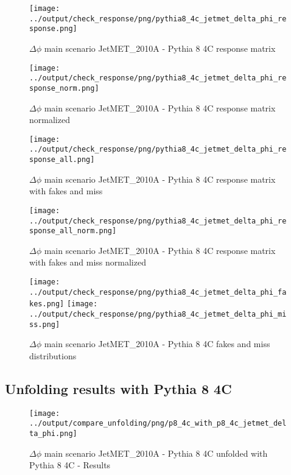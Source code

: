 \documentclass[11pt]{book}
\begin{document}
\begin{figure}[ht]
\centering
\texttt{[image: ../output/check\_response/png/pythia8\_4c\_jetmet\_delta\_phi\_response.png]}
\caption{$\Delta\phi$ main scenario JetMET\_2010A - Pythia 8 4C response matrix}
\label{p8_jetmet_delta_phi_response}
\end{figure}

\begin{figure}[ht]
\centering
\texttt{[image: ../output/check\_response/png/pythia8\_4c\_jetmet\_delta\_phi\_response\_norm.png]}
\caption{$\Delta\phi$ main scenario JetMET\_2010A - Pythia 8 4C response matrix normalized}
\label{p8_jetmet_delta_phi_response_norm}
\end{figure}

\begin{figure}[ht]
\centering
\texttt{[image: ../output/check\_response/png/pythia8\_4c\_jetmet\_delta\_phi\_response\_all.png]}
\caption{$\Delta\phi$ main scenario JetMET\_2010A - Pythia 8 4C response matrix with fakes and miss}
\label{p8_jetmet_delta_phi_response_all}
\end{figure}

\begin{figure}[ht]
\centering
\texttt{[image: ../output/check\_response/png/pythia8\_4c\_jetmet\_delta\_phi\_response\_all\_norm.png]}
\caption{$\Delta\phi$ main scenario JetMET\_2010A - Pythia 8 4C response matrix with fakes and miss normalized}
\label{p8_jetmet_delta_phi_response_all_norm}
\end{figure}

\begin{figure}[ht]
\centering
\texttt{[image: ../output/check\_response/png/pythia8\_4c\_jetmet\_delta\_phi\_fakes.png]}
\texttt{[image: ../output/check\_response/png/pythia8\_4c\_jetmet\_delta\_phi\_miss.png]}
\caption{$\Delta\phi$ main scenario JetMET\_2010A - Pythia 8 4C fakes and miss distributions}
\label{p8_jetmet_delta_phi_fakesmiss}
\end{figure}

\clearpage
\subsection{Unfolding results with Pythia 8 4C}

\begin{figure}[ht]
\centering
\texttt{[image: ../output/compare\_unfolding/png/p8\_4c\_with\_p8\_4c\_jetmet\_delta\_phi.png]}
\caption{$\Delta\phi$ main scenario JetMET\_2010A - Pythia 8 4C unfolded with Pythia 8 4C - Results}
\label{p8_p8_jetmet_delta_phi_a}
\end{figure}
\end{document}
